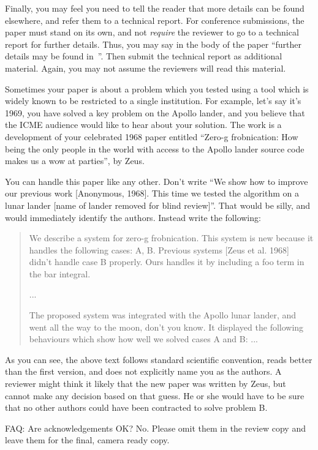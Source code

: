 \documentclass{article}
\begin{document}
Finally, you may feel you need to tell the reader that more details can be found elsewhere, and refer them to a technical report. For conference
submissions, the paper must stand on its own, and not {\em require} the reviewer to go to a technical report for further details. Thus, you may say in
the body of the paper ``further details may be found in~\cite{Authors12b}''.  Then submit the technical report as additional material. Again, you may not assume the reviewers will read this material.

Sometimes your paper is about a problem which you tested using a tool which is widely known to be restricted to a single institution.  For example, let's say it's 1969, you have solved a key problem on the Apollo lander, and you believe that the ICME audience would like to hear about your solution.  The work is a development of your celebrated 1968 paper entitled ``Zero-g frobnication: How being the only people in the world with access to the Apollo lander source code makes us a wow at parties'', by Zeus.

You can handle this paper like any other.  Don't write ``We show how to improve our previous work [Anonymous, 1968].  This time we tested the algorithm on a lunar lander [name of lander removed for blind review]''. That would be silly, and would immediately identify the authors. Instead write the following:
\begin{quotation}
  \noindent
  We describe a system for zero-g frobnication.  This
  system is new because it handles the following cases:
  A, B.  Previous systems [Zeus et al. 1968] didn't
  handle case B properly.  Ours handles it by including
  a foo term in the bar integral.

  ...

  The proposed system was integrated with the Apollo
  lunar lander, and went all the way to the moon, don't
  you know.  It displayed the following behaviours
  which show how well we solved cases A and B: ...
\end{quotation}

As you can see, the above text follows standard scientific convention, reads better than the first version, and does not explicitly name you as the authors. A reviewer might think it likely that the new paper was written by Zeus, but cannot make any decision based on that guess. He or she would have to be sure that no other authors could have been contracted to solve problem B.

FAQ: Are acknowledgements OK?  No. Please omit them in the review copy and leave them for the final, camera ready copy.
\end{document}
